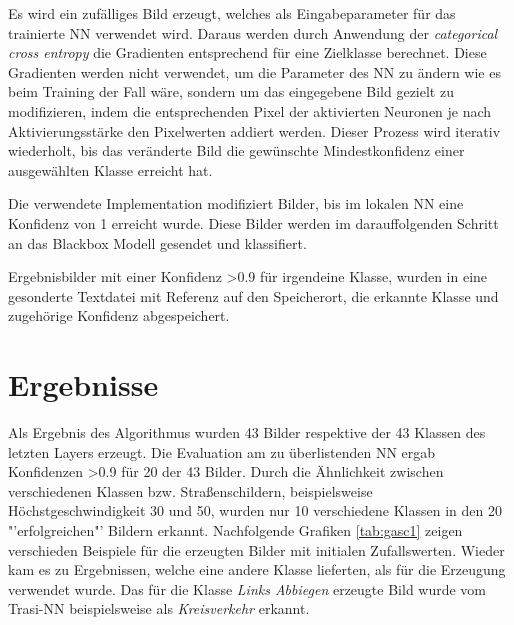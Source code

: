 Es wird ein zufälliges Bild erzeugt, welches als Eingabeparameter für das trainierte NN verwendet wird. 
Daraus werden durch Anwendung der \textit{categorical cross entropy} die Gradienten entsprechend für eine Zielklasse berechnet. Diese Gradienten werden nicht verwendet, um die Parameter des NN zu ändern wie es beim Training der Fall wäre, sondern um das eingegebene Bild gezielt zu modifizieren, indem die entsprechenden Pixel der aktivierten Neuronen je nach Aktivierungsstärke den Pixelwerten addiert werden.
Dieser Prozess wird iterativ wiederholt, bis das veränderte Bild die gewünschte Mindestkonfidenz einer ausgewählten Klasse erreicht hat. 


Die verwendete Implementation modifiziert Bilder, bis im lokalen \ac{NN} eine Konfidenz von 1 erreicht wurde. Diese Bilder werden im darauffolgenden Schritt an das Blackbox Modell gesendet und klassifiert. 


Ergebnisbilder mit einer Konfidenz >0.9 für irgendeine Klasse, wurden in eine gesonderte Textdatei mit Referenz auf den Speicherort, die erkannte Klasse und zugehörige Konfidenz abgespeichert.

%
%

\section{Ergebnisse}
Als Ergebnis des Algorithmus wurden 43 Bilder respektive der 43 Klassen des letzten Layers erzeugt. Die Evaluation am zu überlistenden \ac{NN} ergab Konfidenzen >0.9 für 20 der 43 Bilder. Durch die Ähnlichkeit zwischen verschiedenen Klassen bzw. Straßenschildern, beispielsweise Höchstgeschwindigkeit 30 und 50, wurden nur 10 verschiedene Klassen in den 20 "'erfolgreichen"' Bildern erkannt.
Nachfolgende Grafiken \ref{tab:gasc1} zeigen verschieden Beispiele für die erzeugten Bilder mit initialen Zufallswerten. Wieder kam es zu Ergebnissen, welche eine andere Klasse lieferten, als für die Erzeugung verwendet wurde. Das für die Klasse \textit{Links Abbiegen} erzeugte Bild wurde vom Trasi-\ac{NN} beispielsweise als \textit{Kreisverkehr} erkannt.

